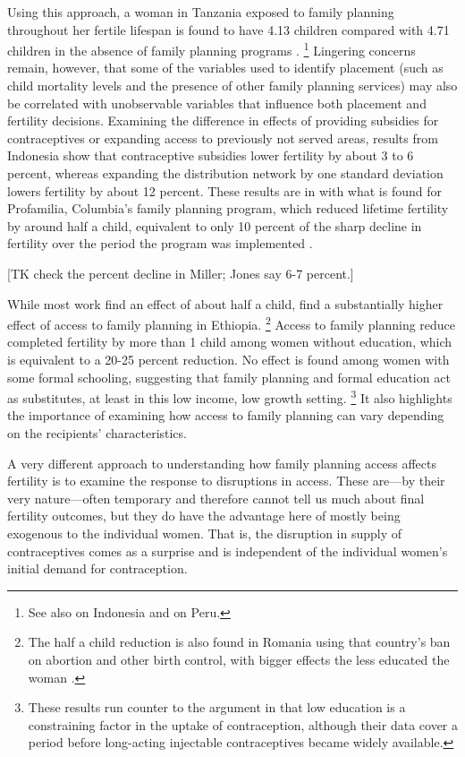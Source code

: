 \documentclass[letterpaper,12pt]{article}
\begin{document}
Using this approach, a woman in Tanzania exposed to family planning throughout 
her fertile lifespan is found to have 4.13 children compared with 4.71 children 
in the absence of family planning programs \citep{angeles98}.%
\footnote{
See also \citet{Angeles2005} on Indonesia and \citep{Angeles2005a} on Peru.
}
Lingering concerns remain, however, that some of the variables used to identify placement
(such as child mortality levels and the presence of other family planning services)
may also be correlated with unobservable variables that influence 
both placement and fertility decisions.
Examining the difference in effects of providing subsidies for contraceptives
or expanding access to previously not served areas, results from Indonesia
show that contraceptive subsidies lower fertility by about 3 to 6 percent,
whereas expanding the distribution network by one standard deviation 
lowers fertility by about 12 percent\citep{Molyneaux2000}.
These results are in with what is found for Profamilia, Columbia's family 
planning program, which reduced lifetime fertility by around 
half a child, equivalent to only 10 percent of the sharp decline in fertility 
over the period the program was implemented \citep{Miller2010}.

[TK check the percent decline in Miller; Jones say 6-7 percent.]


While most work find an effect of about half a child, \citet{Portner2011}
find a substantially higher effect of access to family planning in Ethiopia.%
\footnote{
The half a child reduction is also found in Romania using that country's 
ban on abortion and other birth control, with bigger effects the less
educated the woman \citep{Pop-Eleches2010}.
}
Access to family planning reduce completed fertility by more than 1 child among 
women without education, which is equivalent to a 20-25 percent reduction.
No effect is found among women with some formal schooling, suggesting that 
family planning and formal education act as 
substitutes, at least in this low income, low growth setting.%
\footnote{
These results run counter to the argument in \citet{Feyisetan1996}
that low education is a constraining factor in the uptake of contraception,
although their data cover a period before long-acting injectable
contraceptives became widely available.
}
It also highlights the importance of examining how access to family planning
can vary depending on the recipients' characteristics.

\citet{Debpuur2002}


A very different approach to understanding how family planning access
affects fertility is to examine the response to disruptions in access.
These are---by their very nature---often temporary and therefore
cannot tell us much about final fertility outcomes, but they do have
the advantage here of mostly being exogenous to the individual women.
That is, the disruption in supply of contraceptives comes as a
surprise and is independent of the individual women's initial
demand for contraception.
\end{document}
